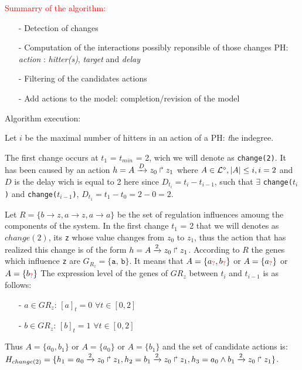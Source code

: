 \textcolor{red}{Summarry of the algorithm:}
\begin{itemize}
\item[-] Detection of changes
\item[-] Computation of the interactions possibly reponsible of those changes
PH:  \textit{action} : \textit{hitter(s)}, \textit{target} and \textit{delay}
\item[-] Filtering of the candidates actions
\item[-] Add actions to the model: completion/revision of the model
\end{itemize}


Algorithm execution:

Let $i$ be the maximal number of hitters in an action of a PH: {\textit the indegree}.

The first change occurs at $t_1$ = $t_{min}$ = 2,
wich we will denote as \texttt{change(2)}.
It has been caused by an action $h = A\xrightarrow{D} z_0 \Rsh z_1$
where $ A \in \mathcal{L}^{\diamond}, | A| \leq i, i=2$ and $D$ is the delay wich is equal to 2 here since
$D_{t_i}=t_i - t_{i-1}$, such that $\exists$ \texttt{change($t_i$)} and \texttt{change($t_{i-1}$)},
$D_{t_1}= t_1 - t_0 = 2 - 0 = 2$.

Let $R=\{ b \rightarrow z, a \rightarrow z, a \rightarrow a \}$
be the set of regulation influences amoung the components of the system.
%
In the first change $t_1$ = 2 that we will denotes as $change(2)$,
its \texttt{z} whose value changes from $z_0$ to $z_1$, thus the action that has realized this change is of the form $h = A\xrightarrow{2} z_0 \Rsh z_1$. According to $R$ the genes which influence \texttt{z} are $G_{R_z} = \{\texttt{a, b}\}$. It means that $A= \{ a_{\textcolor{red}{?}}, b_{\textcolor{red}{?}} \} $ or $A= \{ a_{\textcolor{red}{?}} \} $ or $A= \{ b_{\textcolor{red}{?}} \} $
%
The expression level of the genes of $G{R_z}$ between $t_i$ and $t_{i-1}$ is as follows:
\begin{itemize}
\item[-] $a \in  G{R_z}$: $[a]_t=0$ $\forall t \in [0,2] $
\item[-] $b \in  G{R_z}$: $[b]_t=1$ $\forall t \in [0,2] $
\end{itemize}
%
Thus $A= \{ a_0, b_1 \} $ or $A= \{ a_0\} $ or $A= \{ b_1 \} $ and the set of candidate actions is:
$H_{change(2)} = \{ h_1=a_0\xrightarrow{2} z_0 \Rsh z_1
, h_2=b_1\xrightarrow{2} z_0 \Rsh z_1
, h_3=a_0 \wedge b_1 \xrightarrow{2} z_0 \Rsh z_1 \}$.

